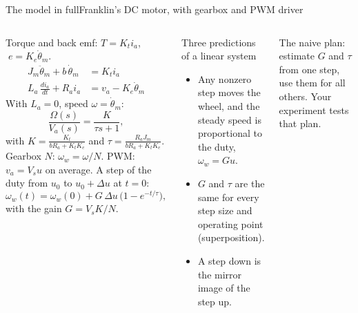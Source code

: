 %
\begin{frame}{The model in full}{Franklin's DC motor, with gearbox and PWM driver}
  \label{app:model}
  \footnotesize
  \setlength{\abovedisplayskip}{2pt}\setlength{\belowdisplayskip}{2pt}
  \begin{columns}[T]
    Torque and back emf: $T = K_t i_a$, $\;e = K_e\dot\theta_m$.
    \begin{align*}
      J_m\ddot\theta_m + b\,\dot\theta_m &= K_t i_a\\
      L_a\,\tfrac{di_a}{dt} + R_a i_a &= v_a - K_e\dot\theta_m
    \end{align*}
    With $L_a = 0$, speed $\omega = \dot\theta_m$:
    \[
      \frac{\Omega(s)}{V_a(s)} = \frac{K}{\tau s + 1},
    \]
    with $K = \tfrac{K_t}{bR_a + K_tK_e}$ and $\tau = \tfrac{R_aJ_m}{bR_a + K_tK_e}$.
    Gearbox $N$: $\omega_w = \omega/N$. PWM: $v_a = V_s u$ on average.
    A step of the duty from $u_0$ to $u_0 + \Delta u$ at $t = 0$:
    \[
      \omega_w(t) = \omega_w(0) + G\,\Delta u\,\big(1 - e^{-t/\tau}\big),
    \]
    with the gain $G = V_sK/N$.
    \begin{block}{\footnotesize Three predictions of a linear system}
      \scriptsize
      \begin{itemize}\setlength{\itemsep}{2pt}
        \item[\textbf{P1}] Any nonzero step moves the wheel, and the steady speed is proportional to the duty, $\omega_w = Gu$.
        \item[\textbf{P2}] $G$ and $\tau$ are the same for every step size and operating point (superposition).
        \item[\textbf{P3}] A step down is the mirror image of the step up.
      \end{itemize}
    \end{block}
    \vspace{3pt}
    The naive plan: estimate $G$ and $\tau$ from one step, use them for all others.
    \alert{Your experiment tests that plan.}
  \end{columns}
\end{frame}
